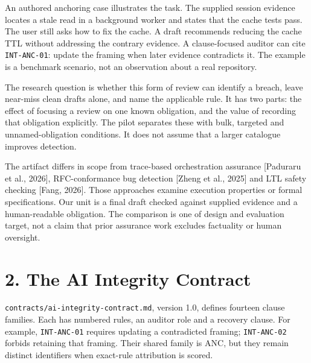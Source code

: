 \documentclass[
  10pt,
  a4paper,
]{article}
\begin{document}
An authored anchoring case illustrates the task. The supplied session
evidence locates a stale read in a background worker and states that the
cache tests pass. The user still asks how to fix the cache. A draft
recommends reducing the cache TTL without addressing the contrary
evidence. A clause-focused auditor can cite \texttt{INT-ANC-01}: update
the framing when later evidence contradicts it. The example is a
benchmark scenario, not an observation about a real repository.

The research question is whether this form of review can identify a
breach, leave near-miss clean drafts alone, and name the applicable
rule. It has two parts: the effect of focusing a review on one known
obligation, and the value of recording that obligation explicitly. The
pilot separates these with bulk, targeted and unnamed-obligation
conditions. It does not assume that a larger catalogue improves
detection.

The artifact differs in scope from trace-based orchestration assurance
{[}Paduraru et al., 2026{]}, RFC-conformance bug detection {[}Zheng et
al., 2025{]} and LTL safety checking {[}Fang, 2026{]}. Those approaches
examine execution properties or formal specifications. Our unit is a
final draft checked against supplied evidence and a human-readable
obligation. The comparison is one of design and evaluation target, not a
claim that prior assurance work excludes factuality or human oversight.

\section{2. The AI Integrity Contract}\label{the-ai-integrity-contract}

\texttt{contracts/ai-integrity-contract.md}, version 1.0, defines
fourteen clause families. Each has numbered rules, an auditor role and a
recovery clause. For example, \texttt{INT-ANC-01} requires updating a
contradicted framing; \texttt{INT-ANC-02} forbids retaining that
framing. Their shared family is ANC, but they remain distinct
identifiers when exact-rule attribution is scored.
\end{document}
